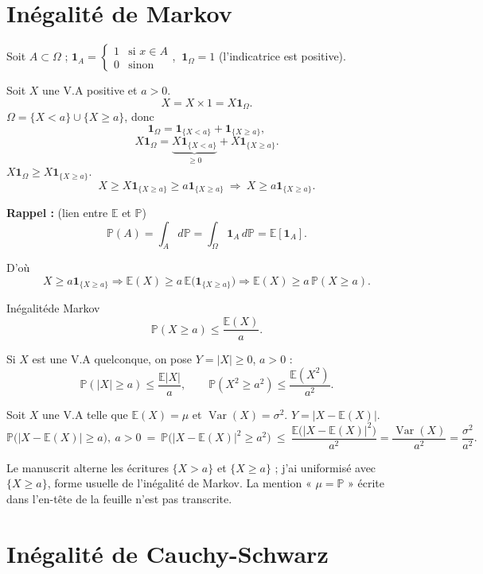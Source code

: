 \documentclass[11pt,a4paper]{article}
\newcommand{\PP}{\mathbb{P}}
\newcommand{\EE}{\mathbb{E}}
\newcommand{\ind}{\mathbf{1}}
\DeclareMathOperator{\Var}{Var}
\begin{document}
\section*{Inégalité de Markov}

Soit $A\subset\Omega$ ; $\ind_A=\begin{cases}1&\text{si }x\in A\\0&\text{sinon}\end{cases}$, $\ \ind_\Omega=1$ \qquad(l'indicatrice est positive).

Soit $X$ une V.A positive et $a>0$.
\[
  X=X\times1=X\ind_\Omega .
\]
$\Omega=\{X<a\}\cup\{X\ge a\}$, donc
\[
  \ind_\Omega=\ind_{\{X<a\}}+\ind_{\{X\ge a\}},
\]
\[
  X\ind_\Omega=\underbrace{X\ind_{\{X<a\}}}_{\ge0}+X\ind_{\{X\ge a\}} .
\]
$X\ind_\Omega\ge X\ind_{\{X\ge a\}}$.
\[
  X\ge X\ind_{\{X\ge a\}}\ge a\ind_{\{X\ge a\}}\ \Longrightarrow\ X\ge a\ind_{\{X\ge a\}} .
\]

\textbf{Rappel :} (lien entre $\EE$ et $\PP$)
\[
  \PP(A)=\int_A d\PP=\int_\Omega\ind_A\,d\PP=\EE[\ind_A].
\]

D'où
\[
  X\ge a\ind_{\{X\ge a\}}\Rightarrow\EE(X)\ge a\,\EE\bigl(\ind_{\{X\ge a\}}\bigr)\Rightarrow\EE(X)\ge a\,\PP(X\ge a).
\]

\begin{enonce}{Inégalité}{de Markov}
\[
  \PP(X\ge a)\le\frac{\EE(X)}{a}.
\]
\end{enonce}

Si $X$ est une V.A quelconque, on pose $Y=|X|\ge0$, $a>0$ :
\[
  \PP(|X|\ge a)\le\frac{\EE|X|}{a},\qquad\PP(X^2\ge a^2)\le\frac{\EE(X^2)}{a^2}.
\]

Soit $X$ une V.A telle que $\EE(X)=\mu$ et $\Var(X)=\sigma^2$.
$Y=|X-\EE(X)|$.
\[
  \PP\bigl(|X-\EE(X)|\ge a\bigr),\ a>0\ =\ \PP\bigl(|X-\EE(X)|^2\ge a^2\bigr)\ \le\ \frac{\EE\bigl(|X-\EE(X)|^2\bigr)}{a^2}=\frac{\Var(X)}{a^2}=\frac{\sigma^2}{a^2}.
\]

\begin{note}
Le manuscrit alterne les écritures $\{X>a\}$ et $\{X\ge a\}$ ; j'ai uniformisé avec $\{X\ge a\}$, forme usuelle de l'inégalité de Markov. La mention « $\mu=\PP$ » écrite dans l'en-tête de la feuille n'est pas transcrite.
\end{note}

\section*{Inégalité de Cauchy-Schwarz}
\end{document}
